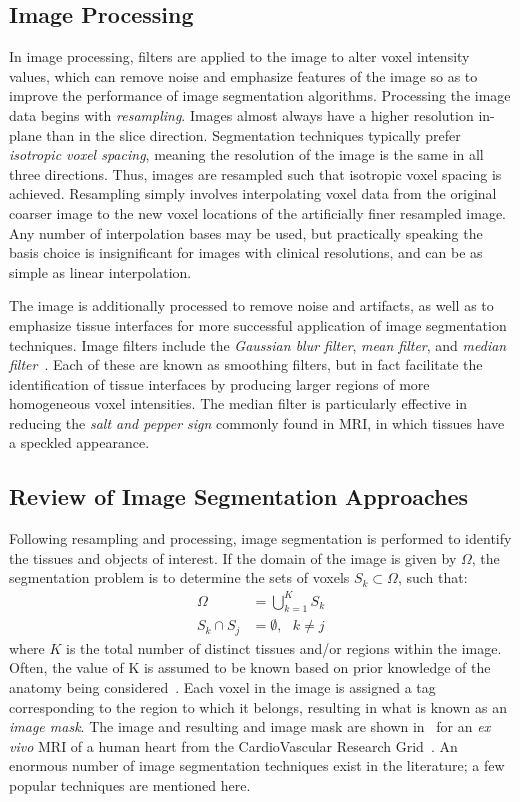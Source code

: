 \subsection{Image Processing}
\label{Image Processing}
In image processing, filters are applied to the image to alter voxel intensity values, which can remove noise and emphasize features of the image so as to improve the performance of image segmentation algorithms. Processing the image data begins with \textit{resampling}. Images almost always have a higher resolution in-plane than in the slice direction. Segmentation techniques typically prefer \textit{isotropic voxel spacing}, meaning the resolution of the image is the same in all three directions. Thus, images are resampled such that isotropic voxel spacing is achieved. Resampling simply involves interpolating voxel data from the original coarser image to the new voxel locations of the artificially finer resampled image. Any number of interpolation bases may be used, but practically speaking the basis choice is insignificant for images with clinical resolutions, and can be as simple as linear interpolation.

The image is additionally processed to remove noise and artifacts, as well as to emphasize tissue interfaces for more successful application of image segmentation techniques. Image filters include the \textit{Gaussian blur filter}, \textit{mean filter}, and \textit{median filter}~\cite{Seg3D}. Each of these are known as smoothing filters, but in fact facilitate the identification of tissue interfaces by producing larger regions of more homogeneous voxel intensities. The median filter is particularly effective in reducing the \textit{salt and pepper sign} commonly found in MRI, in which tissues have a speckled appearance.

\subsection{Review of Image Segmentation Approaches}
\label{Review of Image Segmentation Approaches}

Following resampling and processing, image segmentation is performed to identify the tissues and objects of interest. If the domain of the image is given by $\Omega$, the segmentation problem is to determine the sets of voxels $S_k \subset \Omega$, such that:
\begin{align}
\Omega &= \bigcup \limits_{k=1}^{K} S_k \\
S_k \cap S_j &= \emptyset, \text{\ \ } k \neq j
\end{align}
where $K$ is the total number of distinct tissues and/or regions within the image. Often, the value of K is assumed to be known based on prior knowledge of the anatomy being considered~\cite{pham_2000}. Each voxel in the image is assigned a tag corresponding to the region to which it belongs, resulting in what is known as an \textit{image mask}. The image and resulting and image mask are shown in~ for an \textit{ex vivo} MRI of a human heart from the CardioVascular Research Grid~\cite{cvgg}. An enormous number of image segmentation techniques exist in the literature; a few popular techniques are mentioned here.

